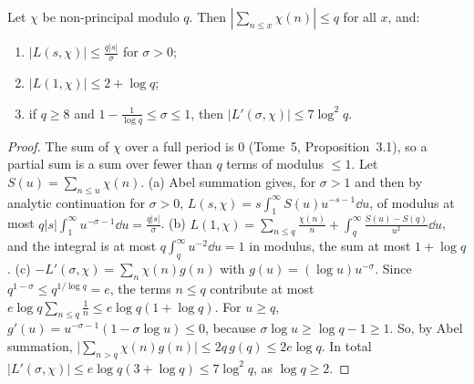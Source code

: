 \begin{lemma}[size of $L$]\label{lem:lsize}
Let $\chi$ be non-principal modulo $q$. Then $|\sum_{n\le x}\chi(n)|\le q$ for all $x$, and:
\begin{enumerate}[label=(\alph*)]
\item $|L(s,\chi)|\le\frac{q|s|}\sigma$ for $\sigma>0$;
\item $|L(1,\chi)|\le2+\log q$;
\item if $q\ge8$ and $1-\frac1{\log q}\le\sigma\le1$, then $|L'(\sigma,\chi)|\le7\log^2q$.
\end{enumerate}
\end{lemma}
\begin{proof}
The sum of $\chi$ over a full period is $0$ (Tome~5, Proposition~3.1), so a partial sum is a sum over fewer than $q$ terms of modulus $\le1$. Let $S(u)=\sum_{n\le u}\chi(n)$.
(a) Abel summation gives, for $\sigma>1$ and then by analytic continuation for $\sigma>0$, $L(s,\chi)=s\int_1^\infty S(u)u^{-s-1}\dd u$, of modulus at most $q|s|\int_1^\infty u^{-\sigma-1}\dd u=\frac{q|s|}\sigma$.
(b) $L(1,\chi)=\sum_{n\le q}\frac{\chi(n)}n+\int_q^\infty\frac{S(u)-S(q)}{u^2}\dd u$, and the integral is at most $q\int_q^\infty u^{-2}\dd u=1$ in modulus, the sum at most $1+\log q$.
(c) $-L'(\sigma,\chi)=\sum_n\chi(n)g(n)$ with $g(u)=(\log u)u^{-\sigma}$. Since $q^{1-\sigma}\le q^{1/\log q}=e$, the terms $n\le q$ contribute at most $e\log q\sum_{n\le q}\frac1n\le e\log q(1+\log q)$. For $u\ge q$,
$g'(u)=u^{-\sigma-1}(1-\sigma\log u)\le0$, because $\sigma\log u\ge\log q-1\ge1$. So, by Abel summation, $\bigl|\sum_{n>q}\chi(n)g(n)\bigr|\le2q\,g(q)\le2e\log q$. In total $|L'(\sigma,\chi)|\le e\log q(3+\log q)\le7\log^2q$, as $\log q\ge2$.
\end{proof}

